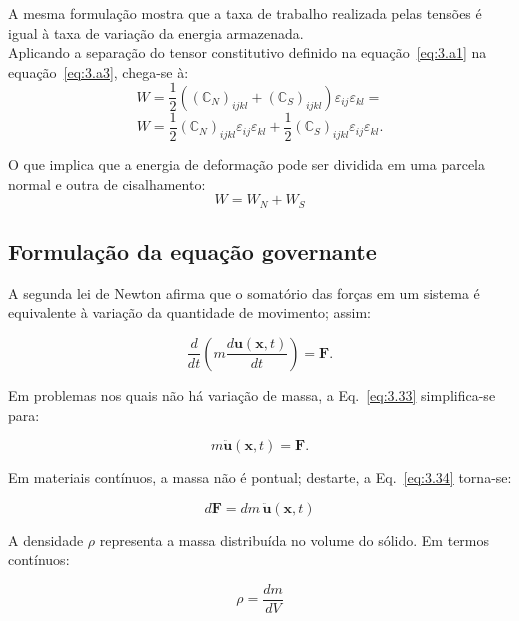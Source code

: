 \noindent A mesma formulação mostra que a taxa de trabalho realizada pelas tensões é igual à taxa de variação da energia armazenada.\\
\indent Aplicando a separação do tensor constitutivo definido na equação~\ref{eq:3.a1} na equação~\ref{eq:3.a3}, chega-se à: $$W=\frac{1}{2}\left((\mathbb{C}_N)_{ijkl}+(\mathbb{C}_S)_{ijkl}\right)\varepsilon_{ij}\varepsilon_{kl} = $$
\begin{equation}
    W=\frac{1}{2}(\mathbb{C}_N)_{ijkl}\varepsilon_{ij}\varepsilon_{kl} + \frac{1}{2}(\mathbb{C}_S)_{ijkl}\varepsilon_{ij}\varepsilon_{kl}.
    \label{eq:3.a4}
\end{equation}

\indent O que implica que a energia de deformação pode ser dividida em uma parcela normal e outra de cisalhamento:
\begin{equation}
    W = W_N + W_S
    \label{eq:3.a5}
\end{equation}

\subsection{Formulação da equação governante}

\indent A segunda lei de Newton afirma que o somatório das forças em um sistema é equivalente à variação da quantidade de movimento; assim: 

\begin{equation}
    \frac{d}{dt} \left( m \frac{d\mathbf{u}(\mathbf{x},t)}{dt} \right) = \mathbf{F}.
    \label{eq:3.33}
\end{equation}


\indent Em problemas nos quais não há variação de massa, a Eq.~\ref{eq:3.33} simplifica-se para: 

\begin{equation}
    m \ddot{\mathbf{u}}(\mathbf{x},t) = \mathbf{F}.
    \label{eq:3.34}
\end{equation}


\indent Em materiais contínuos, a massa não é pontual; destarte, a Eq.~\ref{eq:3.34} torna-se: 

\begin{equation}
    d\mathbf{F} = dm \,\ddot{\mathbf{u}}(\mathbf{x},t)
    \label{eq:3.35}
\end{equation}


\indent A densidade $\rho$ representa a massa distribuída no volume do sólido. Em termos contínuos: 

\begin{equation}
    \rho = \frac{dm}{dV}
    \label{eq:3.36}
\end{equation}

